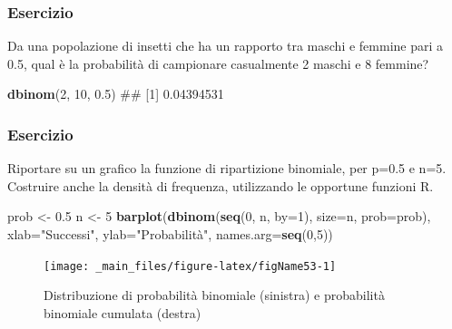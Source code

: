 \documentclass[a4paper,12pt,oneside]{book}
\newenvironment{Shaded}{\begin{snugshade}}{\end{snugshade}}
\newcommand{\KeywordTok}[1]{\textcolor[rgb]{0.13,0.29,0.53}{\textbf{#1}}}
\newcommand{\DataTypeTok}[1]{\textcolor[rgb]{0.13,0.29,0.53}{#1}}
\newcommand{\DecValTok}[1]{\textcolor[rgb]{0.00,0.00,0.81}{#1}}
\newcommand{\FloatTok}[1]{\textcolor[rgb]{0.00,0.00,0.81}{#1}}
\newcommand{\StringTok}[1]{\textcolor[rgb]{0.31,0.60,0.02}{#1}}
\newcommand{\NormalTok}[1]{#1}
\theoremstyle{definition}
\theoremstyle{definition}
\theoremstyle{definition}
\theoremstyle{remark}
\begin{document}
\subsubsection{Esercizio}\label{esercizio}

Da una popolazione di insetti che ha un rapporto tra maschi e femmine
pari a 0.5, qual è la probabilità di campionare casualmente 2 maschi e 8
femmine?

\begin{Shaded}
\begin{Highlighting}[]
\KeywordTok{dbinom}\NormalTok{(}\DecValTok{2}\NormalTok{, }\DecValTok{10}\NormalTok{, }\FloatTok{0.5}\NormalTok{)}
\NormalTok{## [1] 0.04394531}
\end{Highlighting}
\end{Shaded}

\subsubsection{Esercizio}\label{esercizio-8}

Riportare su un grafico la funzione di ripartizione binomiale, per p=0.5
e n=5. Costruire anche la densità di frequenza, utilizzando le opportune
funzioni R.

\begin{Shaded}
\begin{Highlighting}[]
\NormalTok{prob <-}\StringTok{ }\FloatTok{0.5}
\NormalTok{n <-}\StringTok{ }\DecValTok{5}
\KeywordTok{barplot}\NormalTok{(}\KeywordTok{dbinom}\NormalTok{(}\KeywordTok{seq}\NormalTok{(}\DecValTok{0}\NormalTok{, n, }\DataTypeTok{by=}\DecValTok{1}\NormalTok{), }\DataTypeTok{size=}\NormalTok{n, }\DataTypeTok{prob=}\NormalTok{prob),}
          \DataTypeTok{xlab=}\StringTok{"Successi"}\NormalTok{, }\DataTypeTok{ylab=}\StringTok{"Probabilità"}\NormalTok{,}
          \DataTypeTok{names.arg=}\KeywordTok{seq}\NormalTok{(}\DecValTok{0}\NormalTok{,}\DecValTok{5}\NormalTok{))}
\end{Highlighting}
\end{Shaded}

\begin{figure}

{\centering \texttt{[image: \_main\_files/figure-latex/figName53-1]} 

}

\caption{Distribuzione di probabilità binomiale (sinistra) e probabilità binomiale cumulata (destra)}\label{fig:figName531}
\end{figure}
\end{document}
